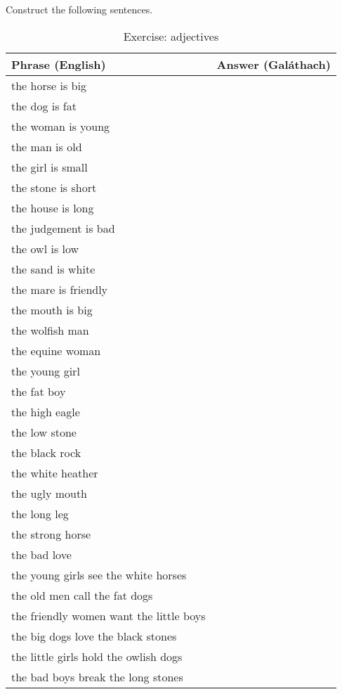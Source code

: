 Construct the following sentences.
\begin{table}[H]
\centering
\begin{tabular}{|l|M{10.0cm}|}
  \toprule
  \textbf{Phrase (English)} & \textbf{Answer (Gal\'{a}thach)}\\
  \toprule
  the horse is big & \\
  \midrule
  the dog is fat & \\
  \midrule
  the woman is young & \\
  \midrule
  the man is old & \\
  \midrule
  the girl is small & \\
  \midrule
  the stone is short & \\
  \midrule
  the house is long & \\
  \midrule
  the judgement is bad & \\
  \midrule
  the owl is low & \\
  \midrule
  the sand is white & \\
  \midrule
  the mare is friendly & \\
  \midrule
  the mouth is big & \\
  \midrule
  the wolfish man & \\
  \midrule
  the equine woman & \\
  \midrule
  the young girl & \\
  \midrule
  the fat boy & \\
  \midrule
  the high eagle & \\
  \midrule
  the low stone & \\
  \midrule
  the black rock & \\
  \midrule
  the white heather & \\
  \midrule
  the ugly mouth & \\
  \midrule
  the long leg & \\
  \midrule
  the strong horse & \\
  \midrule
  the bad love & \\
  \midrule
  the young girls see the white horses & \\
  \midrule
  the old men call the fat dogs & \\
  \midrule
  the friendly women want the little boys & \\
  \midrule
  the big dogs love the black stones & \\
  \midrule
  the little girls hold the owlish dogs & \\
  \midrule
  the bad boys break the long stones & \\
  \bottomrule
\end{tabular}
\label{exercise_adjectives}
\caption{Exercise: adjectives}
\end{table}

